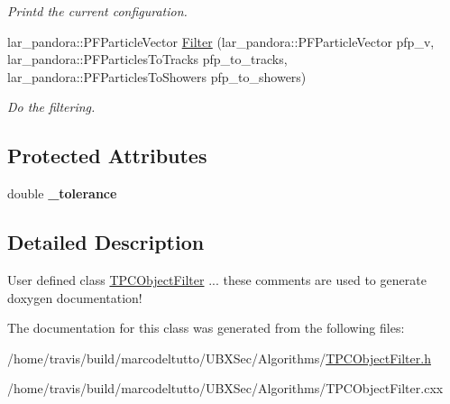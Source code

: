 \begin{DoxyCompactItemize}
\begin{DoxyCompactList}\small\item\em \-Printd the current configuration. \end{DoxyCompactList}\item 
\hypertarget{classubana_1_1TPCObjectFilter_a4522b692674aeee4f88a134a1cf36a08}{lar\-\_\-pandora\-::\-P\-F\-Particle\-Vector \hyperlink{classubana_1_1TPCObjectFilter_a4522b692674aeee4f88a134a1cf36a08}{\-Filter} (lar\-\_\-pandora\-::\-P\-F\-Particle\-Vector pfp\-\_\-v, lar\-\_\-pandora\-::\-P\-F\-Particles\-To\-Tracks pfp\-\_\-to\-\_\-tracks, lar\-\_\-pandora\-::\-P\-F\-Particles\-To\-Showers pfp\-\_\-to\-\_\-showers)}\label{classubana_1_1TPCObjectFilter_a4522b692674aeee4f88a134a1cf36a08}

\begin{DoxyCompactList}\small\item\em \-Do the filtering. \end{DoxyCompactList}\end{DoxyCompactItemize}
\subsection*{\-Protected \-Attributes}
\begin{DoxyCompactItemize}
\item 
\hypertarget{classubana_1_1TPCObjectFilter_a86137c0a525fdd2b5a63afe4ff79c23c}{double {\bfseries \-\_\-tolerance}}\label{classubana_1_1TPCObjectFilter_a86137c0a525fdd2b5a63afe4ff79c23c}

\end{DoxyCompactItemize}


\subsection{\-Detailed \-Description}
\-User defined class \hyperlink{classubana_1_1TPCObjectFilter}{\-T\-P\-C\-Object\-Filter} ... these comments are used to generate doxygen documentation! 

\-The documentation for this class was generated from the following files\-:\begin{DoxyCompactItemize}
\item 
/home/travis/build/marcodeltutto/\-U\-B\-X\-Sec/\-Algorithms/\hyperlink{TPCObjectFilter_8h}{\-T\-P\-C\-Object\-Filter.\-h}\item 
/home/travis/build/marcodeltutto/\-U\-B\-X\-Sec/\-Algorithms/\-T\-P\-C\-Object\-Filter.\-cxx\end{DoxyCompactItemize}
